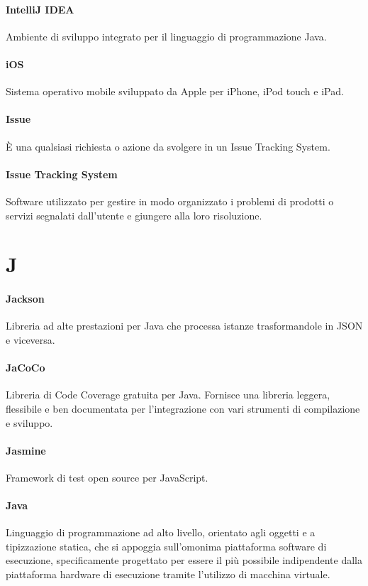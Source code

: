 \documentclass[]{article}
\begin{document}
	\paragraph*{IntelliJ IDEA}
	Ambiente di sviluppo integrato per il linguaggio di programmazione Java.

	\paragraph*{iOS}
	Sistema operativo mobile sviluppato da Apple per iPhone, iPod touch e iPad.

	\paragraph*{Issue}
	È una qualsiasi richiesta o azione da svolgere in un Issue Tracking System.

	\paragraph*{Issue Tracking System}
	Software utilizzato per gestire in modo organizzato i problemi di prodotti o servizi segnalati dall’utente e giungere alla loro risoluzione.

	\newpage

	\section*{J}

    \paragraph*{Jackson}
    Libreria ad alte prestazioni per Java che processa istanze trasformandole in JSON e viceversa.

	\paragraph*{JaCoCo}
	Libreria di Code Coverage gratuita per Java. Fornisce una libreria leggera, flessibile e ben documentata per l'integrazione con vari strumenti di compilazione e sviluppo.
	
	\paragraph*{Jasmine}
	Framework di test open source per JavaScript.

	\paragraph*{Java}
	Linguaggio di programmazione ad alto livello, orientato agli oggetti e a tipizzazione statica, che si appoggia sull'omonima piattaforma software di esecuzione, specificamente progettato per essere il più possibile indipendente dalla piattaforma hardware di esecuzione tramite l'utilizzo di macchina virtuale.
\end{document}
